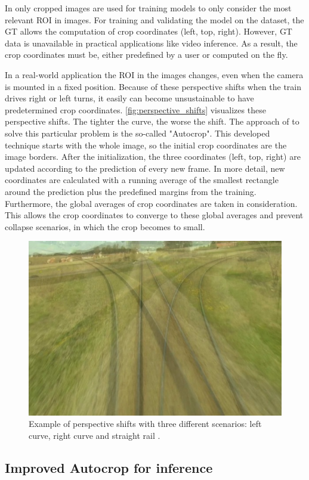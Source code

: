 In \cite{tepNet2024} only cropped images are used for training models to only consider the most relevant \ac{ROI} in images.
For training and validating the model on the dataset, the \ac{GT} allows the computation of crop coordinates (left, top, right).
However, \ac{GT} data is unavailable in practical applications like video inference.
As a result, the crop coordinates must be, either predefined by a user or computed on the fly.

In a real-world application the ROI in the images changes, even when the camera is mounted in a fixed position.
Because of these perspective shifts when the train drives right or left turns, it easily can become unsustainable to have predetermined crop coordinates.
\autoref{fig:perspective_shifts} visualizes these perspective shifts.
The tighter the curve, the worse the shift.
The approach of \cite{tepNet2024} to solve this particular problem is the so-called "Autocrop".
This developed technique starts with the whole image, so the initial crop coordinates are the image borders.
After the initialization, the three coordinates (left, top, right) are updated according to the prediction of every new frame.
In more detail, new coordinates are calculated with a running average of the smallest rectangle around the prediction plus the predefined margins from the training.
Furthermore, the global averages of crop coordinates are taken in consideration.
This allows the crop coordinates to converge to these global averages and prevent collapse scenarios, in which the crop becomes to small.


\begin{figure}[H]
    \centering
    \includegraphics[width=0.6\linewidth]{PICs/Baselinepaper/perspective_shifts.jpg}
    \caption{Example of perspective shifts with three different scenarios: left curve, right curve and straight rail \cite{tepNet2024}.}
    \label{fig:perspective_shifts}
\end{figure}

\subsection{Improved Autocrop for inference}

